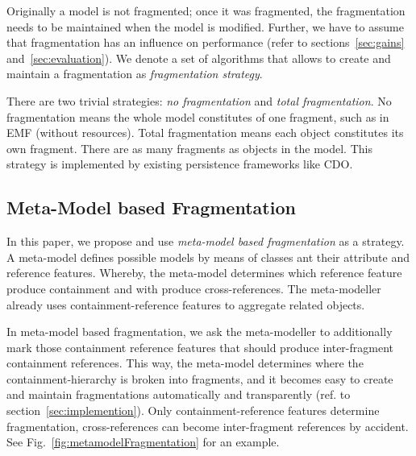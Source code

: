 Originally a model is not fragmented; once it was fragmented, the fragmentation needs to be maintained when the model is modified. Further, we have to assume that fragmentation has an influence on performance (refer to sections~\ref{sec:gains} and~\ref{sec:evaluation}). We denote a set of algorithms that allows to create and maintain a fragmentation as \emph{fragmentation strategy}.

There are two trivial strategies: \emph{no fragmentation} and \emph{total fragmentation}. No fragmentation means the whole model constitutes of one fragment, such as in EMF (without resources). Total fragmentation means each object constitutes its own fragment. There are as many fragments as objects in the model. This strategy is implemented by existing persistence frameworks like CDO.

\subsection{Meta-Model based Fragmentation}

In this paper, we propose and use \emph{meta-model based fragmentation} as a strategy. A meta-model defines possible models by means of classes ant their attribute and reference features. Whereby, the meta-model determines which reference feature produce containment and with produce cross-references. The meta-modeller already uses containment-reference features to aggregate related objects.

In meta-model based fragmentation, we ask the meta-modeller to additionally mark those containment reference features that should produce inter-fragment containment references. 
This way, the meta-model determines where the containment-hierarchy is broken into fragments, and it becomes easy to create and maintain fragmentations automatically and transparently (ref. to section~\ref{sec:implemention}). Only containment-reference features determine fragmentation, cross-references can become inter-fragment references by accident. See Fig.~\ref{fig:metamodelFragmentation} for an example.



